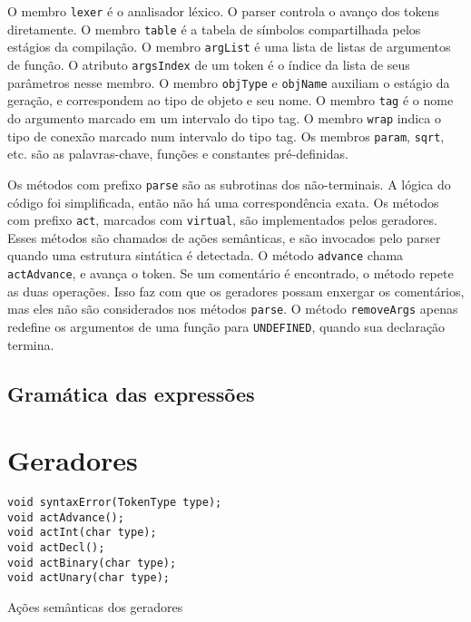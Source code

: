 \documentclass[10pt,a4paper]{article}
\newenvironment{code}{\captionsetup{type=listing}}{}
\begin{document}
O membro \texttt{lexer} é o analisador léxico. O parser controla o avanço dos tokens diretamente.
O membro \texttt{table} é a tabela de símbolos compartilhada pelos estágios da compilação.
O membro \texttt{argList} é uma lista de listas de argumentos de função.
O atributo \texttt{argsIndex} de um token é o índice da lista de seus parâmetros nesse membro.
O membro \texttt{objType} e \texttt{objName} auxiliam o estágio da geração, e correspondem ao tipo de objeto e seu nome.
O membro \texttt{tag} é o nome do argumento marcado em um intervalo do tipo tag.
O membro \texttt{wrap} indica o tipo de conexão marcado num intervalo do tipo tag.
Os membros \texttt{param}, \texttt{sqrt}, etc. são as palavras-chave, funções e constantes pré-definidas.

Os métodos com prefixo \texttt{parse} são as subrotinas dos não-terminais.
A lógica do código foi simplificada, então não há uma correspondência exata.
Os métodos com prefixo \texttt{act}, marcados com \texttt{virtual}, são implementados pelos geradores.
Esses métodos são chamados de ações semânticas, e são invocados pelo parser quando uma estrutura sintática é detectada.
O método \texttt{advance} chama \texttt{actAdvance}, e avança o token.
Se um comentário é encontrado, o método repete as duas operações.
Isso faz com que os geradores possam enxergar os comentários, mas eles não são considerados nos métodos \texttt{parse}.
O método \texttt{removeArgs} apenas redefine os argumentos de uma função para \texttt{UNDEFINED},
quando sua declaração termina.

\subsection{Gramática das expressões}

\newpage
\section{Geradores}


\begin{code}
\begin{verbatim}
void syntaxError(TokenType type);
void actAdvance();
void actInt(char type);
void actDecl();
void actBinary(char type);
void actUnary(char type);
\end{verbatim}
\caption{Ações semânticas dos geradores}
\label{actions}
\end{code}
\end{document}
